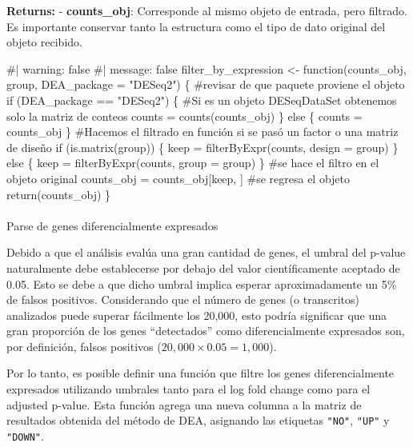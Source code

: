 \documentclass[
  10pt,
]{article}
\makeatletter
\let\oldparagraph\paragraph
\renewcommand{\paragraph}{
    \@ifstar
      \xxxParagraphStar
      \xxxParagraphNoStar
  }
\newcommand{\xxxParagraphStar}[1]{\oldparagraph*{#1}\mbox{}}
\newcommand{\xxxParagraphNoStar}[1]{\oldparagraph{#1}\mbox{}}
\newenvironment{Shaded}{\begin{snugshade}}{\end{snugshade}}
\newcommand{\NormalTok}[1]{\textcolor[rgb]{0.00,0.23,0.31}{#1}}
\makeatother
\begin{document}
\textbf{Returns:} - \textbf{counts\_obj}: Corresponde al mismo objeto de
entrada, pero filtrado. Es importante conservar tanto la estructura como
el tipo de dato original del objeto recibido.

\begin{Shaded}
\begin{Highlighting}[]
\NormalTok{\#| warning: false}
\NormalTok{\#| message: false}
\NormalTok{filter\_by\_expression \textless{}{-} function(counts\_obj, group, DEA\_package = "DESeq2") \{}
\NormalTok{  \#revisar de que paquete proviene el objeto}
\NormalTok{  if (DEA\_package == "DESeq2") \{}
\NormalTok{    \#Si es un objeto DESeqDataSet obtenemos solo la matriz de conteos}
\NormalTok{    counts = counts(counts\_obj)}
\NormalTok{  \} else \{}
\NormalTok{    counts = counts\_obj}
\NormalTok{  \}}
\NormalTok{  \#Hacemos el filtrado en función si se pasó un factor o una matriz de diseño}
\NormalTok{  if (is.matrix(group)) \{}
\NormalTok{    keep = filterByExpr(counts, design = group)}
\NormalTok{  \} else \{}
\NormalTok{    keep = filterByExpr(counts, group = group)}
\NormalTok{  \}}
\NormalTok{  \#se hace el filtro en el objeto original}
\NormalTok{  counts\_obj = counts\_obj[keep, ]}
\NormalTok{  \#se regresa el objeto}
\NormalTok{  return(counts\_obj)}
\NormalTok{\}}
\end{Highlighting}
\end{Shaded}

\paragraph{Parse de genes diferencialmente
expresados}\label{parse-de-genes-diferencialmente-expresados}

Debido a que el análisis evalúa una gran cantidad de genes, el umbral
del p-value naturalmente debe establecerse por debajo del valor
científicamente aceptado de 0.05. Esto se debe a que dicho umbral
implica esperar aproximadamente un 5\% de falsos positivos. Considerando
que el número de genes (o transcritos) analizados puede superar
fácilmente los 20,000, esto podría significar que una gran proporción de
los genes ``detectados'' como diferencialmente expresados son, por
definición, falsos positivos (\(20,000 \times 0.05 = 1,000\)).

Por lo tanto, es posible definir una función que filtre los genes
diferencialmente expresados utilizando umbrales tanto para el log fold
change como para el adjusted p-value. Esta función agrega una nueva
columna a la matriz de resultados obtenida del método de DEA, asignando
las etiquetas \texttt{"NO"}, \texttt{"UP"} y \texttt{"DOWN"}.
\end{document}
